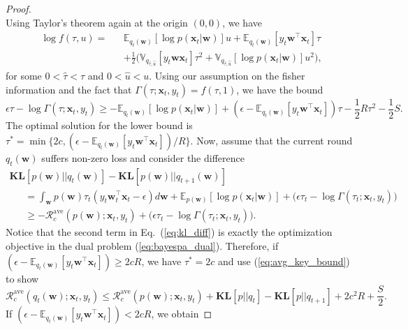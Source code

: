 \documentclass[twoside,11pt]{article}
\newcommand{\xv}{\bm{x}}
\newcommand{\regret}{\mathcal{R}}
\newcommand{\wv}{\bm{w}}
\newcommand{\ep}{\mathbb{E}}
\newcommand{\KL}{\textbf{KL}}
\newcommand{\var}{\mathbb{V}}
\newcommand{\E}{\mathbb{E}}
\begin{document}
\begin{proof}
{\begin{equation*}
\end{equation*}}
Using Taylor's theorem again at the origin $(0,0)$, we have
\setlength\arraycolsep{1pt}\begin{eqnarray}
\log f(\tau, u) = && \ep_{q_t(\wv)} \left[\log p(\xv_t | \wv) \right] u +\E_{q_{t}(\wv)}\left[ y_t \wv^\top \xv_t \right] \tau  \nonumber \\
&& +\frac{1}{2} \Big(\var_{q_{\hat{\tau}, \hat{u}}}\left[y_t \wv \xv_t\right] \tau^2+\var_{q_{\hat{\tau}, \hat{u}}}\left[\log p(\xv_t | \wv)\right] u^2\Big), \nonumber
\end{eqnarray}
for some $0 < \hat{\tau} < \tau$ and $0 < \hat{u} < u$. Using our assumption on the fisher information and the fact that $\Gamma(\tau; \xv_t, y_t) = f(\tau, 1)$, we have the bound
\begin{equation} \label{eq:avg_key_bound}
\epsilon \tau - \log \Gamma(\tau; \xv_t, y_t) \geq -\ep_{q_t(\wv)} \left[\log p(\xv_t | \wv) \right]+\left( \epsilon-\E_{q_{t}(\wv)}\left[ y_t \wv^\top \xv_t \right] \right) \tau - \frac{1}{2} R \tau^2-\frac{1}{2} S.
\end{equation}
The optimal solution for the lower bound is $\tau^* = \min\{2c, (\epsilon-\E_{q_{t}(\wv)}[y_t \wv^\top \xv_t])/R\}$. Now, assume that the current round $q_t(\wv)$ suffers non-zero loss and consider the difference
\begin{equation}
\begin{array}{l}
\KL\left[p(\wv) || q_t(\wv)\right]-\KL\left[p(\wv) || q_{t+1}(\wv)\right]  \\
~~~~~~~ = \int_{\wv}{p(\wv) \tau_t\left( y_t \wv_t^\top \xv_t-\epsilon \right) d\wv}+\ep_{p(\wv)}[\log p(\xv_t | \wv)]+\Big(\epsilon \tau_t-\log \Gamma(\tau_t; \xv_t, y_t) \Big) \\
~~~~~~~ \geq -\regret_{c}^\text{ave}(p(\wv); \xv_t, y_t)+\Big(\epsilon \tau_t-\log \Gamma(\tau_t; \xv_t, y_t) \Big). \label{eq:kl_diff}
 \end{array}
\end{equation}
Notice that the second term in Eq.~(\ref{eq:kl_diff}) is exactly the optimization objective in the dual problem (\ref{eq:bayespa_dual}). Therefore, if $(\epsilon-\E_{q_{t}(\wv)}[y_t \wv^\top \xv_t]) \geq 2cR$, we have $\tau^* = 2c$ and use (\ref{eq:avg_key_bound}) to show
\begin{equation*}
\regret_c^\text{ave}(q_t(\wv); \xv_t, y_t) \leq \regret_{c}^\text{ave}(p(\wv); \xv_t, y_t)+ \KL[p || q_t]-\KL[p || q_{t+1}] +2 c^2 R + \frac{S}{2}.
\end{equation*}
If $(\epsilon-\E_{q_{t}(\wv)}[y_t \wv^\top \xv_t]) < 2cR$, we obtain


\end{proof}
\end{document}
